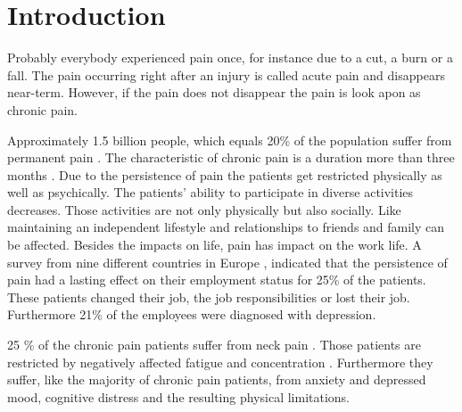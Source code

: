 \chapter{Introduction}

Probably everybody experienced pain once, for instance due to a cut, a burn or a fall. The pain occurring right after an injury is called acute pain and disappears near-term. However, if the pain does not disappear the pain is look apon as chronic pain. \cite{Briggs2010,Mello2016}

Approximately 1.5 billion people, which equals 20\% of the population suffer from permanent pain \cite{Zeidan2016,Macfarlanea2016}. The characteristic of chronic pain is a duration more than three months \cite{Mello2016}. Due to the persistence of pain the patients get restricted physically as well as psychically. 
The patients' ability to participate in diverse activities decreases. Those activities are not only physically but also socially. Like maintaining an independent lifestyle and relationships to friends and family can be affected. Besides the impacts on life, pain has impact on the work life. A survey from nine different countries in Europe , indicated that the persistence of pain had a lasting effect on their employment status for 25\% of the patients. These patients changed their job, the job responsibilities or lost their job. Furthermore  21\% of the employees were diagnosed with depression. \cite{Breivik2006} 



25 \% of the chronic pain patients suffer from neck pain \cite{Macfarlanea2016}. Those patients are restricted by negatively affected fatigue and concentration \cite{vanRanderaat2016}. Furthermore they suffer, like the majority of chronic pain patients, from anxiety and depressed mood, cognitive distress and the resulting physical limitations. \cite{gross2013}

